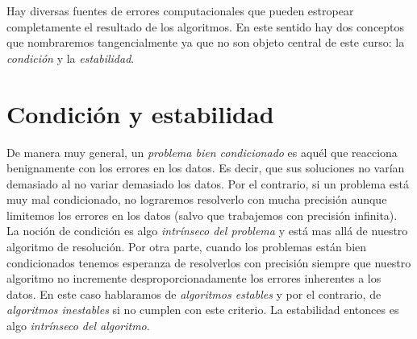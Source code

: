 Hay diversas fuentes de errores computacionales que pueden estropear completamente el resultado de los algoritmos. En este sentido hay dos conceptos que nombraremos tangencialmente ya que no son objeto central de este curso: la \emph{condición} y la \emph{estabilidad}.

\section{Condición y estabilidad}
De manera muy general, un \emph{problema bien condicionado} es aquél que reacciona benignamente con los errores en los datos. Es decir, que sus soluciones no varían demasiado al no variar demasiado los datos. Por el contrario, si un problema está muy mal condicionado, no lograremos resolverlo con mucha precisión aunque limitemos los errores en los datos (salvo que trabajemos con precisión infinita). La noción de condición es algo \emph{intrínseco del problema} y está mas allá de nuestro algoritmo de resolución.  Por otra parte, cuando los problemas están bien condicionados tenemos esperanza de resolverlos con precisión siempre que nuestro algoritmo no incremente desproporcionadamente los errores inherentes a los datos. En este caso hablaramos de \emph{algoritmos estables} y por el contrario, de  \emph{algoritmos inestables} si no cumplen con este criterio. La estabilidad entonces es algo \emph{intrínseco del algoritmo}.




